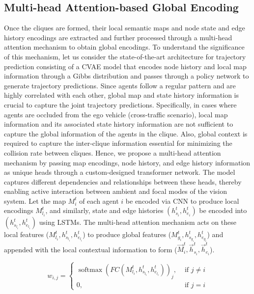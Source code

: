 \documentclass{article}
\begin{document}
\subsection{Multi-head Attention-based Global Encoding}
Once the cliques are formed, their local semantic maps and node state and edge history encodings are extracted and further processed through a multi-head attention mechanism to obtain global encodings. To understand the significance of this mechanism, let us consider the state-of-the-art architecture for trajectory prediction consisting of a CVAE model that encodes node history and local map information through a Gibbs distribution and passes through a policy network to generate trajectory predictions. Since agents follow a regular pattern and are highly correlated with each other, global map and state history information is crucial to capture the joint trajectory predictions. Specifically, in cases where agents are occluded from the ego vehicle (cross-traffic scenario), local map information and its associated state history information are not sufficient to capture the global information of the agents in the clique. Also, global context is required to capture the inter-clique information essential for minimizing the collision rate between cliques. Hence, we propose a multi-head attention mechanism by passing map encodings, node history, and edge history information as unique heads through a custom-designed transformer network. The model captures different dependencies and relationships between these heads, thereby enabling active interaction between ambient and focal modes of the vision system. Let the map $M^t_i$ of each agent $i$ be encoded via CNN to produce local encodings $M_{l_i}^t$, and similarly, state and edge histories $(h_{s_i}^t, h_{e_i}^t)$ be encoded into $(h_{s_{l_i}}^t, h_{e_{l_i}}^t )$ using LSTMs. The multi-head attention mechanism acts on these local features ($M_{l_i}^t,h_{s_{l_i}}^t, h_{e_{l_i}}^t $) to produce global features  ($M_{g_i}^t, h_{s_{g_i}}^t, h_{e_{g_i}}^t $) and appended with the local contextual information to form ($\vec M^t_i, \vec h_{s_i}^t, \vec h_{e_i}^t $).  
\begin{figure}
    \vspace{-20pt}
{\footnotesize$$
w_{i, j}= \begin{cases}\operatorname{softmax}\left(FC\left(M_{l_i}^t,h_{s_{l_i}}^t, h_{e_{l_i}}^t \right)\right)_j, & \text { if } j\neq i \\ 0, & \text { if } j=i \end{cases}
$$}\vspace{-20pt}
\end{figure}
\end{document}
